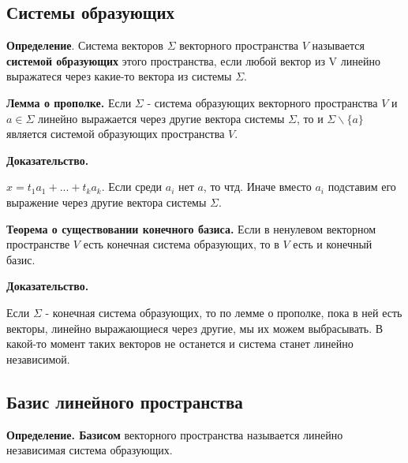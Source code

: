 \documentclass[a4paper]{article}
\begin{document}
    \newpage \begin{center}
                 \begin{Large}
                 \end{Large}
    \end{center}
    \subsection*{Системы образующих}
    \textbf{Определение}. Система векторов $\Sigma$ векторного пространства $V$ называется \textbf{системой образующих} этого пространства, если любой вектор из V линейно выражатеся через какие-то вектора из системы $\Sigma$.

	\begin{htheorem}
		\textbf{Лемма о прополке.} Если $\Sigma$ - система образующих векторного пространства $V$ и $a \in \Sigma$ линейно выражается через другие вектора системы $\Sigma$, то и $\Sigma \backslash{} \{ a \}$ является системой образующих пространства $V$.
	\end{htheorem}
	
	\begin{hproof}
		\textbf{Доказательство.}
		
		$x = t_1a_1 + ... + t_ka_k$. Если среди $a_i$ нет $a$, то чтд. Иначе вместо $a_i$ подставим его выражение через другие вектора системы $\Sigma$.
	\end{hproof}

	\begin{htheorem}
		\textbf{Теорема о существовании конечного базиса.} Если в ненулевом векторном пространстве $V$ есть конечная система образующих, то в $V$ есть и конечный базис.
	\end{htheorem}
	
	\begin{hproof}
		\textbf{Доказательство.} 
		
		Если $\Sigma$ - конечная система образующих, то по лемме о прополке, пока в ней есть векторы, линейно выражающиеся через другие, мы их можем выбрасывать. В какой-то момент таких векторов не останется и система станет линейно независимой.
	\end{hproof}


    \subsection*{Базис линейного пространства}
    \textbf{Определение. Базисом} векторного пространства называется линейно независимая
    система образующих.
\end{document}
